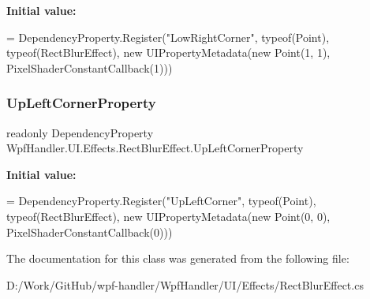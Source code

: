 {\bfseries Initial value\+:}
\begin{DoxyCode}
=
            DependencyProperty.Register(\textcolor{stringliteral}{"LowRightCorner"}, typeof(Point), typeof(RectBlurEffect),
                \textcolor{keyword}{new} UIPropertyMetadata(\textcolor{keyword}{new} Point(1, 1), PixelShaderConstantCallback(1)))
\end{DoxyCode}
\mbox{\label{class_wpf_handler_1_1_u_i_1_1_effects_1_1_rect_blur_effect_aaf9984410cb78206a63a2d56dff7b04d}} 
\subsubsection{\texorpdfstring{Up\+Left\+Corner\+Property}{UpLeftCornerProperty}}
{\footnotesize\ttfamily readonly Dependency\+Property Wpf\+Handler.\+U\+I.\+Effects.\+Rect\+Blur\+Effect.\+Up\+Left\+Corner\+Property\hspace{0.3cm}{\ttfamily [static]}}

{\bfseries Initial value\+:}
\begin{DoxyCode}
=
            DependencyProperty.Register(\textcolor{stringliteral}{"UpLeftCorner"}, typeof(Point), typeof(RectBlurEffect),
                \textcolor{keyword}{new} UIPropertyMetadata(\textcolor{keyword}{new} Point(0, 0), PixelShaderConstantCallback(0)))
\end{DoxyCode}


The documentation for this class was generated from the following file\+:\begin{DoxyCompactItemize}
\item 
D\+:/\+Work/\+Git\+Hub/wpf-\/handler/\+Wpf\+Handler/\+U\+I/\+Effects/Rect\+Blur\+Effect.\+cs\end{DoxyCompactItemize}
